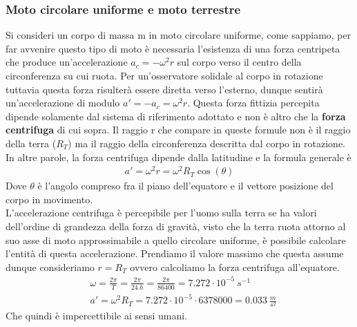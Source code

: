 \documentclass[10pt,a4paper]{article}
\begin{document}
\subsubsection*{Moto circolare uniforme e moto terrestre}
Si consideri un corpo di massa m in moto circolare uniforme, come sappiamo, per far avvenire questo tipo di moto è necessaria l'esistenza di una forza centripeta che produce un'accelerazione $a_c=-\omega^2r$ sul corpo verso il centro della circonferenza su cui ruota. Per un'osservatore solidale al corpo in rotazione tuttavia questa forza risulterà essere diretta verso l'esterno, dunque sentirà un'accelerazione di modulo $a'=-a_c=\omega^2r$. Questa forza fittizia percepita dipende solamente dal sistema di riferimento adottato e non è altro che la \textbf{forza centrifuga} di cui sopra. Il raggio r che compare in queste formule non è il raggio della terra ($R_T$) ma il raggio della circonferenza descritta dal corpo in rotazione. In altre parole, la forza centrifuga dipende dalla latitudine e la formula generale è
\begin{align*}
a'=\omega^2 r = \omega^2 R_T \cos(\theta)
\end{align*}
Dove $\theta$ è l'angolo compreso fra il piano dell'equatore e il vettore posizione del corpo in movimento.\\
L'accelerazione centrifuga è percepibile per l'uomo sulla terra se ha valori dell'ordine di grandezza della forza di gravità, visto che la terra ruota attorno al suo asse di moto approssimabile a quello circolare uniforme, è possibile calcolare l'entità di questa accelerazione. Prendiamo il valore massimo che questa assume dunque consideriamo $r = R_T$ ovvero calcoliamo la forza centrifuga all'equatore. 
\begin{align*}
	&\omega = \frac{2\pi}{T}= \frac{2\pi}{24\ h} = \frac{2\pi}{86400}= 7.272\cdot 10^{-5}\ s^{-1}\\
	&a'=\omega^2 R_T=7.272\cdot 10^{-5}\cdot 6378000 = 0.033\ \frac{m}{s^2}
\end{align*}
Che quindi è impercettibile ai sensi umani.
\end{document}
